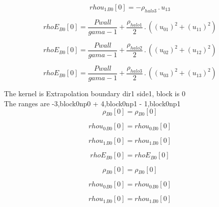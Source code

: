 \documentclass{article}
\begin{document}
\begin{dmath}{rhou_{1}{_{B0}}}[{0}] = - \rho_{halo 3} \,.\, u_{13}\end{dmath}

\begin{dmath}{rhoE{_{B0}}}[{0}] = \frac{Pwall}{gama - 1} + \frac{\rho_{halo 1}}{2} \,.\, \left(\left(u_{01} \right)^{2} + \left(u_{11} \right)^{2}\right)\end{dmath}

\begin{dmath}{rhoE{_{B0}}}[{0}] = \frac{Pwall}{gama - 1} + \frac{\rho_{halo 2}}{2} \,.\, \left(\left(u_{02} \right)^{2} + \left(u_{12} \right)^{2}\right)\end{dmath}

\begin{dmath}{rhoE{_{B0}}}[{0}] = \frac{Pwall}{gama - 1} + \frac{\rho_{halo 3}}{2} \,.\, \left(\left(u_{03} \right)^{2} + \left(u_{13} \right)^{2}\right)\end{dmath}

\noindent The kernel is Extrapolation boundary dir1 side1, block is 0\\\noindent The ranges are -3,block0np0 + 4,block0np1 - 1,block0np1\\\begin{dmath}{\rho{_{B0}}}[{0}] = {\rho{_{B0}}}[{0}]\end{dmath}

\begin{dmath}{rhou_{0}{_{B0}}}[{0}] = {rhou_{0}{_{B0}}}[{0}]\end{dmath}

\begin{dmath}{rhou_{1}{_{B0}}}[{0}] = {rhou_{1}{_{B0}}}[{0}]\end{dmath}

\begin{dmath}{rhoE{_{B0}}}[{0}] = {rhoE{_{B0}}}[{0}]\end{dmath}

\begin{dmath}{\rho{_{B0}}}[{0}] = {\rho{_{B0}}}[{0}]\end{dmath}

\begin{dmath}{rhou_{0}{_{B0}}}[{0}] = {rhou_{0}{_{B0}}}[{0}]\end{dmath}

\begin{dmath}{rhou_{1}{_{B0}}}[{0}] = {rhou_{1}{_{B0}}}[{0}]\end{dmath}
\end{document}
